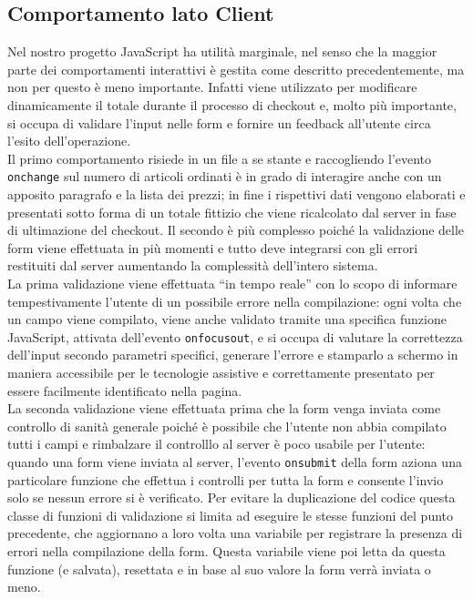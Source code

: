     \subsection{Comportamento lato Client}
    Nel nostro progetto JavaScript ha utilità marginale, nel senso che la maggior parte dei comportamenti interattivi è gestita come descritto precedentemente, ma non per questo è meno importante. Infatti viene utilizzato per modificare dinamicamente il totale durante il processo di checkout e, molto più importante, si occupa di validare l’input nelle form e fornire un feedback all’utente circa l’esito dell’operazione.\\
    Il primo comportamento risiede in un file a se stante e raccogliendo l’evento \texttt{onchange} sul numero di articoli ordinati è in grado di interagire anche con un apposito paragrafo e la lista dei prezzi; in fine i rispettivi dati vengono elaborati e presentati sotto forma di un totale fittizio che viene ricalcolato dal server in fase di ultimazione del checkout.
    Il secondo è più complesso poiché la validazione delle form viene effettuata in più momenti e tutto deve integrarsi con gli errori restituiti dal server aumentando la complessità dell’intero sistema.\\
    La prima validazione viene effettuata “in tempo reale” con lo scopo di informare tempestivamente l’utente di un possibile errore nella compilazione: ogni volta che un campo viene compilato, viene anche validato tramite una specifica funzione JavaScript, attivata dell’evento \texttt{onfocusout}, e si occupa di valutare la correttezza dell’input secondo parametri specifici, generare l’errore e stamparlo a schermo in maniera accessibile per le tecnologie assistive e correttamente presentato per essere facilmente identificato nella pagina.\\
    La seconda validazione viene effettuata prima che la form venga inviata come controllo di sanità generale poiché è possibile che l’utente non abbia compilato tutti i campi e rimbalzare il controlllo al server è poco usabile per l’utente: quando una form viene inviata al server, l’evento \texttt{onsubmit} della form aziona una particolare funzione che effettua i controlli per tutta la form e consente l’invio solo se nessun errore si è verificato. Per evitare la duplicazione del codice questa classe di funzioni  di validazione si limita ad eseguire le stesse funzioni del punto precedente, che aggiornano a loro volta una variabile per registrare la presenza di errori nella compilazione della form. Questa variabile viene poi letta da questa funzione (e salvata), resettata e in base al suo valore la form verrà inviata o meno.